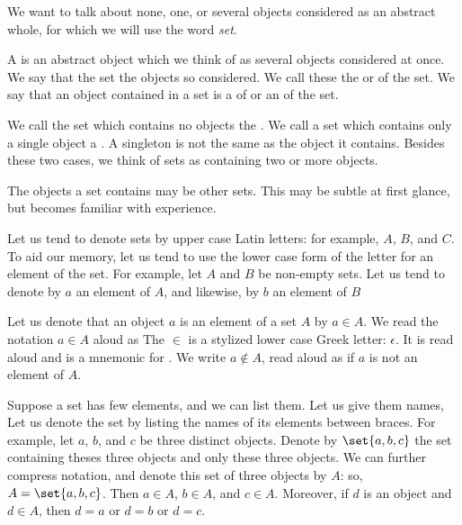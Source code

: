 
\sbasic


\sstart
{}


We want to talk
about none, one, or
several objects considered
as an abstract whole,
for which we will use
the word \textit{set}.


A  is an abstract
object which we think of as
several objects considered
at once.
We say that the set
the objects so considered.
We call these
the
 or
 of the set.
We say that an object
contained in a set is a
 of or an
 of the set.

We call the set which contains
no objects the
.
We call
a set which contains
only a single object a
.
A singleton is not the
same as the object
it contains.
Besides these two cases,
we think of sets
as containing
two or more objects.

The objects a set contains
may be other sets.
This may be subtle at
first glance, but becomes
familiar with experience.


Let us tend to
denote sets by
upper case Latin letters:
for example,
$A$, $B$, and $C$.
To aid our memory,
let us tend to use the lower
case form of the letter for
an element of the set.
For example,
let $A$ and $B$ be
non-empty sets.
Let us tend to denote by
$a$ an element of $A$,
and likewise,
by $b$ an element of $B$

Let us denote that
an object $a$
is an element of a set $A$
by $a \in A$.
We read the notation
$a \in A$ aloud as 
The $\in$ is a stylized
lower case Greek letter: $\epsilon$.
It is
read aloud  and
is a mnemonic for .
We write $a \not\in A$, read aloud
as  if $a$ is not
an element of $A$.

Suppose a set has few elements,
and we can list them.
Let us give them names,
Let us denote the
set by listing
the names of its elements
between braces.
For example,
let $a$, $b$, and $c$
be three distinct objects.
Denote by $\set{a, b, c}$
the set containing theses
three objects and only these
three objects.
We can further compress notation,
and denote this set of
three objects by $A$:
so, $A = \set{a, b, c}$.
Then $a \in A$,
$b \in A$, and $c \in A$.
Moreover, if $d$
is an object and
$d \in A$, then $d = a$
or $d = b$ or $d = c$.

